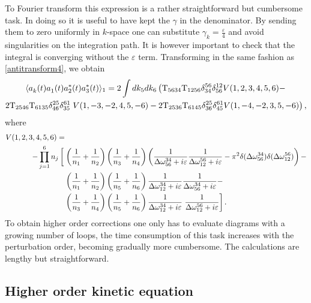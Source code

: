 To Fourier transform this expression is a rather straightforward but cumbersome task. In doing so it is useful to have kept the $\gamma$ in the denominator. 
By sending them to zero uniformly in $k$-space one can substitute $\gamma_k= \frac{\varepsilon}{4}$ and avoid singularities on the integration path. It is however important 
to check that the integral is converging without the $\varepsilon$ term. Transforming in the same fashion as \eqref{antitransform4}, we obtain 
\begin{multline}
    \langle a_k^{}(t) a_1^{}(t) a_2^*(t)a_3^*(t) \rangle_{1} = 2\int dk_5 dk_6 \left( \mathrm{T}_{5634}\mathrm{T}_{1256}\delta^{56}_{34}\delta^{12}_{56}  V(1,2,3,4,5,6) - \right.\\
    2\mathrm{T}_{2546}\mathrm{T}_{6135}\delta^{25}_{46}\delta^{61}_{35}
    \left.V(1,-3,-2,4,5,-6) - 2\mathrm{T}_{2536}\mathrm{T}_{6145}\delta^{25}_{36}\delta^{61}_{45} V(1,-4,-2,3,5,-6)  \right),
    \label{finalfourpoint}
\end{multline}
where 
\begin{equation}
    \begin{aligned}
        V(1,2,3,4,5,6) =&
        \\
        -\prod_{j=1}^{6}n_j\left[ \vphantom{\frac{1}{n_7}} \right.
        &\left( \frac{1}{n_1} +\frac{1}{n_2} \right) \left( \frac{1}{n_3} +\frac{1}{n_4} \right)
        \left( \frac{1}{\delomega^{34}_{56} + i\varepsilon}\frac{1}{\delomega^{56}_{12} + i\varepsilon} - \pi^2\delta(\delomega^{34}_{56})\delta(\delomega^{56}_{12})\right)-  
        \\
        &\left( \frac{1}{n_1} +\frac{1}{n_2} \right) \left( \frac{1}{n_5} +\frac{1}{n_6} \right)
        \frac{1}{\delomega^{34}_{12} + i\varepsilon}\frac{1}{\delomega^{34}_{56} + i\varepsilon} -
        \\
        &\left( \frac{1}{n_3} +\frac{1}{n_4} \right) \left( \frac{1}{n_5} +\frac{1}{n_6} \right)
        \frac{1}{\delomega^{34}_{12} + i\varepsilon}\left.\frac{1}{\delomega^{56}_{12} + i\varepsilon}
        \right].
    \end{aligned}
\end{equation}
To obtain higher order corrections one only has to evaluate diagrams with a growing number of loops, the time consumption of this task increases with the perturbation order, becoming
gradually more cumbersome. The calculations are lengthy but straightforward. \\
\subsection{Higher order kinetic equation}

